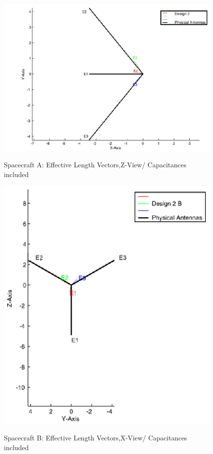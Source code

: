 \documentclass[a4paper,14pt]{extbook}
\begin{document}
\begin{figure}
        \begin{center}
        \includegraphics[width=12cm]{HeffD2HGA0-500kHz-ZViewCap.eps}\\
        \caption{Spacecraft A: Effective Length Vectors,Z-View/ Capacitances included}\label{fig_Heff_D2_A_Z_ViewCap}
    \end{center}
\end{figure}

\begin{figure}
  \begin{center}
    \includegraphics[width=12cm]{HeffD2HGA0-500kHz-XViewCap_B.eps}\\
    \caption{Spacecraft B: Effective Length Vectors,X-View/ Capacitances included}\label{fig_Heff_D2_B_X_ViewCap}
  \end{center}
\end{figure}
\end{document}
